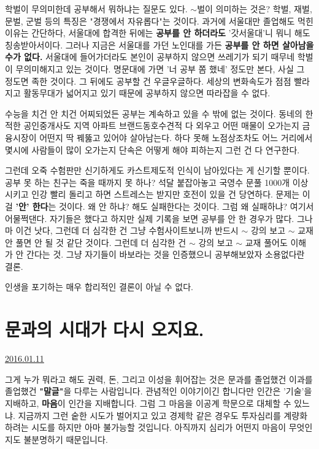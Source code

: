 학벌이 무의미한데 공부해서 뭐하냐는 질문도 있다.
$\sim$벌이 의미하는 것은? 학벌, 재벌, 문벌, 군벌 등의 특징은 "경쟁에서 자유롭다"는 것이다.
과거에 서울대만 졸업해도 먹힌 이유는 간단하다, 서울대에 합격한 뒤에는 \textbf{공부를 안 하더라도} '갓서울대'니 뭐니 해도 칭송받아서이다.
그러나 지금은 서울대를 가던 노인대를 가든 \textbf{공부를 안 하면 살아남을 수가 없다.}
서울대에 들어가더라도 본인이 공부하지 않으면 쓰레기가 되기 때무네 학벌이 무의미해지고 있는 것이다.
명문대에 가면 '너 공부 쫌 했네' 정도만 본다, 사실 그 정도면 족한 것이다. 그 뒤에도 공부할 건 우글우글하다.
세상의 변화속도가 점점 빨라지고 활동무대가 넓어지고 있기 때문에 공부하지 않으면 따라잡을 수 없다.
\vspace{5mm}

수능을 치건 안 치건 어찌되었든 공부는 계속하고 있을 수 밖에 없는 것이다.
동네의 한적한 공인중개사도 지역 아파트 브랜드동호수견적 다 외우고 어떤 매물이 오가는지 금융시장이 어떤지 딱 꿰뚫고 있어야 살아남는다.
하다 못해 노점상조차도 어느 거리에서 몇시에 사람들이 많이 오가는지 단속은 어떻게 해야 피하는지 그런 건 다 연구한다.
\vspace{5mm}

그런데 오죽 수험판만 신기하게도 카스트제도적 인식이 남아있다는 게 신기할 뿐이다.
공부 못 하는 친구는 죽을 때까지 못 하나?
석달 붙잡아놓고 국영수 문풀 1000개 이상 시키고 인강 빨리 돌리고 하면 스트레스는 받지만 호전이 있을 건 당연하다.
문제는 이걸 \textbf{'안' 한다}는 것이다.
왜 안 하냐? 해도 실패한다는 것이다. 그럼 왜 실패하냐? 여기서 어물쩍댄다.
자기들은 했다고 하지만 실제 기록을 보면 공부를 안 한 경우가 많다.
그나마 이건 낫다, 그런데 더 심각한 건 그냥 수험사이트보니까 반드시 $\sim$ 강의 보고 $\sim$ 교재 안 풀면 안 될 것 같단 것이다.
그런데 더 심각한 건 $\sim$ 강의 보고 $\sim$ 교재 풀어도 이해가 안 간다는 것. 그냥 자기들이 바보라는 것을 인증했으니 공부해보았자 소용없다란 결론.
\vspace{5mm}

인생을 포기하는 매우 합리적인 결론이 아닐 수 없다.
\vspace{5mm}






\section{문과의 시대가 다시 오지요.}
\href{https://www.kockoc.com/Apoc/584304}{2016.01.11}

\vspace{5mm}

그게 누가 뭐라고 해도
권력, 돈, 그리고 이성을 휘어잡는 것은 문과를 졸업했건 이과를 졸업했건
\textbf{"말글"}을 다루는 사람입니다.
관념적인 이야기이긴 합니다만
인간은 '기술'을 지배하고, \textbf{마음}이 인간을 지배합니다.
그럼 그 마음을 이공계 학문으로 대체할 수 있느냐. 지금까지 그런 숱한 시도가 벌어지고 있고
경제학 같은 경우도 투자심리를 계량화하려는 시도를 하지만 아마 불가능할 것입니다.
아직까지 심리가 어떤지 마음이 무엇인지도 불분명하기 때문입니다.
\vspace{5mm}

